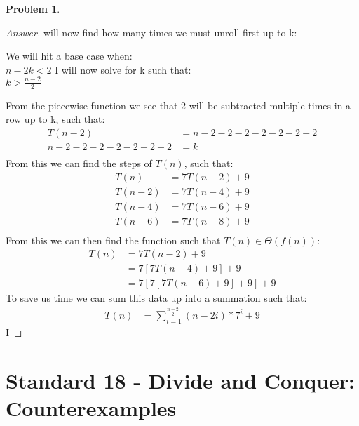 \documentclass[11pt]{article}
\theoremstyle{definition}
\theoremstyle{definition}
\newtheorem{required}{Problem}
\theoremstyle{definition}
\begin{document}
\begin{required}
\begin{enumerate}
\begin{proof}[Answer] 
 will now find how many times we must unroll first up to k: \\
\begin{center}
We will hit a base case when: \\
$n-2k < 2$
I will now solve for k such that: \\
$k > \frac{n-2}{2}$
\end{center}
From the piecewise function we see that 2 will be subtracted multiple times in a row up to k, such that: \\
\begin{align*}
T(n-2) &= n - 2 - 2 - 2 - 2 - 2 - 2 - 2 \\
n - 2 - 2 - 2 - 2 - 2 - 2 - 2 &= k \\
\end{align*}
From this we can find the steps of $T(n)$, such that: \\
\begin{align*}
T(n) &= 7T(n-2) + 9  \\
T(n-2) &= 7T(n-4) + 9 \\
T(n-4) &= 7T(n-6) + 9 \\
T(n-6) &= 7T(n-8) + 9 \\
\end{align*}
From this we can then find the function such that $T(n) \in \Theta(f(n))$: \\
\begin{align*}
T(n) &= 7T(n-2) + 9  \\
&= 7[7T(n-4) + 9] +9 \\
&= 7[7[7T(n-6) + 9] +9] + 9
\end{align*}
To save us time we can sum this data up into a summation such that: \\
\begin{align*}
T(n) &= \sum_{i=1}^{\frac{n-2}{2}} (n-2i) * 7^{i} +9
\end{align*}
I
\end{proof}
\end{enumerate}
\end{required}

\newpage
\section{Standard 18 - Divide and Conquer: Counterexamples}
\end{document}
